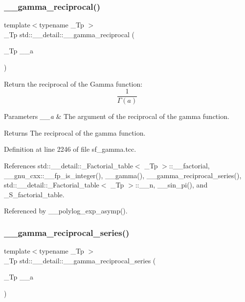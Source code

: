 \subsubsection{\texorpdfstring{\+\_\+\+\_\+gamma\+\_\+reciprocal()}{\_\_gamma\_reciprocal()}}
{\footnotesize\ttfamily template$<$typename \+\_\+\+Tp $>$ \\
\+\_\+\+Tp std\+::\+\_\+\+\_\+detail\+::\+\_\+\+\_\+gamma\+\_\+reciprocal (\begin{DoxyParamCaption}\item[{\+\_\+\+Tp}]{\+\_\+\+\_\+a }\end{DoxyParamCaption})}

Return the reciprocal of the Gamma function\+: \[ \frac{1}{\Gamma(a)} \]


\begin{DoxyParams}{Parameters}
{\em \+\_\+\+\_\+a} & The argument of the reciprocal of the gamma function. \\
\hline
\end{DoxyParams}
\begin{DoxyReturn}{Returns}
The reciprocal of the gamma function. 
\end{DoxyReturn}


Definition at line 2246 of file sf\+\_\+gamma.\+tcc.



References std\+::\+\_\+\+\_\+detail\+::\+\_\+\+Factorial\+\_\+table$<$ \+\_\+\+Tp $>$\+::\+\_\+\+\_\+factorial, \+\_\+\+\_\+gnu\+\_\+cxx\+::\+\_\+\+\_\+fp\+\_\+is\+\_\+integer(), \+\_\+\+\_\+gamma(), \+\_\+\+\_\+gamma\+\_\+reciprocal\+\_\+series(), std\+::\+\_\+\+\_\+detail\+::\+\_\+\+Factorial\+\_\+table$<$ \+\_\+\+Tp $>$\+::\+\_\+\+\_\+n, \+\_\+\+\_\+sin\+\_\+pi(), and \+\_\+\+S\+\_\+factorial\+\_\+table.



Referenced by \+\_\+\+\_\+polylog\+\_\+exp\+\_\+asymp().

\mbox{\label{namespacestd_1_1____detail_a08dc6d850e2f02ff45deaa4772298cf3}} 
\subsubsection{\texorpdfstring{\+\_\+\+\_\+gamma\+\_\+reciprocal\+\_\+series()}{\_\_gamma\_reciprocal\_series()}}
{\footnotesize\ttfamily template$<$typename \+\_\+\+Tp $>$ \\
\+\_\+\+Tp std\+::\+\_\+\+\_\+detail\+::\+\_\+\+\_\+gamma\+\_\+reciprocal\+\_\+series (\begin{DoxyParamCaption}\item[{\+\_\+\+Tp}]{\+\_\+\+\_\+a }\end{DoxyParamCaption})}

